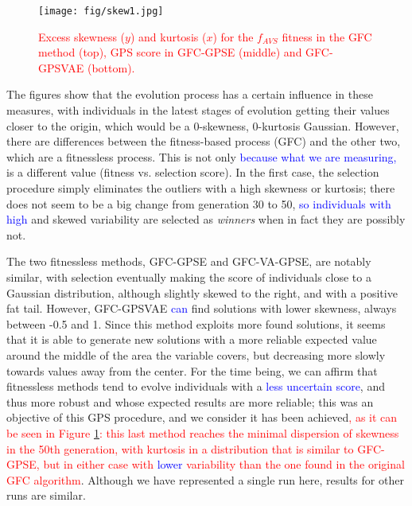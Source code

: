 \documentclass[10pt,journal,compsoc]{IEEEtran}
\begin{document}
\begin{figure}[ht]	
	\begin{center}
		\texttt{[image: fig/skew1.jpg]}
		\caption{\textcolor{red}{Excess skewness ($y$) and kurtosis ($x$)
			for the $f_{AVS}$ fitness in the  {\sf GFC} method \cite{salem_cig2018} (top), GPS score in {\sf GFC-GPSE} (middle) and {\sf GFC-GPSVAE} (bottom).}}
		\label{fig:gfcsk}
	\end{center}	
\end{figure}
The figures show that the evolution process has a certain influence in
these measures, with individuals in the latest stages of evolution
getting their values closer to the origin, which would be a 0-skewness, 0-kurtosis
Gaussian. However, there are differences between the fitness-based
process ({\sf GFC}) and the other two, which are a fitnessless process. This is not only  \textcolor{blue}{because what we are measuring,} is a different value (fitness vs. selection score). 
In the first case, the
selection procedure simply eliminates the outliers with a high
skewness or kurtosis; there does not seem to be a big change from
generation 30 to 50,  \textcolor{blue}{so individuals with  high}
and skewed variability are selected as {\em winners} when in fact they
are possibly not.

The two fitnessless methods, {\sf GFC-GPSE} and {\sf GFC-VA-GPSE}, are
notably similar, with selection eventually making the score of
individuals close to a Gaussian distribution, although slightly skewed
to the right, and with a positive fat tail. However, {\sf GFC-GPSVAE}
 \textcolor{blue}{can} find solutions with lower skewness, always between -0.5 and
1. Since this method exploits more found solutions, it seems that it
is able to generate new solutions with a more reliable expected value
around the middle of the area the variable covers, but decreasing more
slowly towards values away from the center. For the time being, we can
affirm that fitnessless methods tend to evolve individuals with a  \textcolor{blue}{less uncertain score}, and thus more robust and whose expected
results are more reliable; this was an objective of this GPS
procedure, and we consider it has been achieved\textcolor{red}{, as it can be seen in
Figure \ref{fig:gfcsk}: this last method reaches the minimal
dispersion of skewness in the 50th generation, with kurtosis in a
distribution that is similar to {\sf GFC-GPSE}, but in either case
with  \textcolor{blue}{lower} variability than the one found in the original {\sf GFC} algorithm}. Although we have
represented a single run here, results for other runs are similar.
\end{document}
